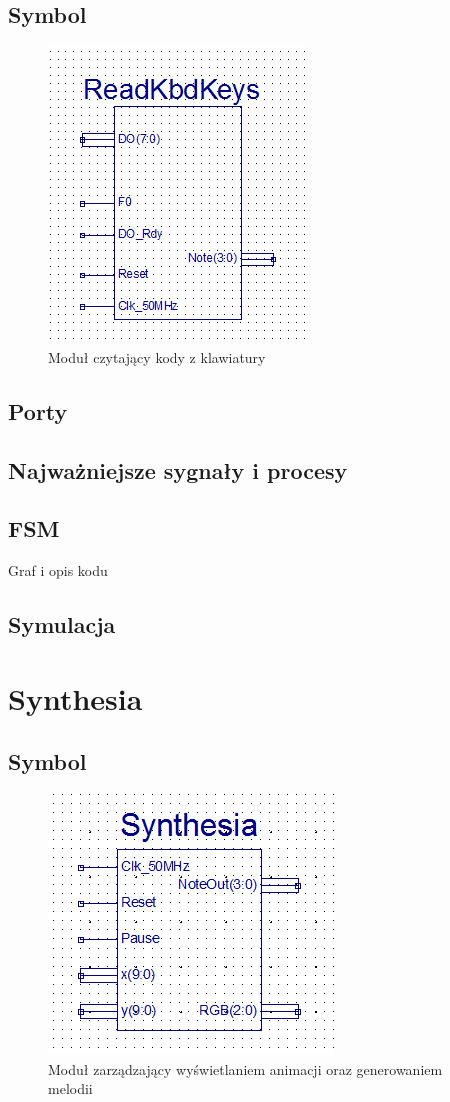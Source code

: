 \documentclass[a4paper]{report}
\begin{document}
		\subsection{Symbol}
			\begin{figure}[h!]
				\centering				
				\includegraphics{readkbdkeys2.png}
				\caption{Moduł czytający kody z klawiatury}
			\end{figure}
		\subsection{Porty}
			
		\subsection{Najważniejsze sygnały i procesy}
		\subsection{FSM}
		Graf i opis kodu
		\subsection{Symulacja}
		\newpage
	\section{Synthesia}
		\subsection{Symbol}
			\begin{figure}[h!]
				\centering
				\includegraphics{synthesia2.png}
				\caption{Moduł zarządzający wyświetlaniem animacji oraz generowaniem melodii}
			\end{figure}
\end{document}
